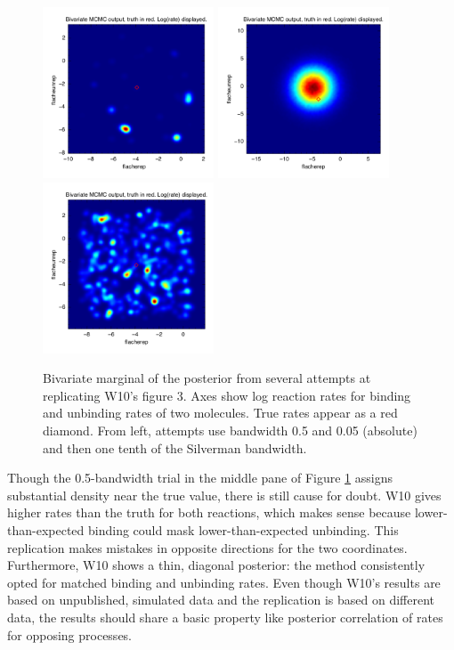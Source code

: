 \documentclass{article}
\begin{document}
\begin{figure}[h!]
\begin{center}
\includegraphics[height=2in,width=2in]{SigD_trial_small_bw_may27.png}
\includegraphics[height=2in,width=2in]{SigD_trial_large_bw_may_29.png}
\includegraphics[height=2in,width=2in]{june8_silverman_over_ten.png}
\caption{Bivariate marginal of the posterior from several attempts at replicating W10's figure 3. Axes show log reaction rates for binding and unbinding rates of two molecules. True rates appear as a red diamond. From left, attempts use bandwidth 0.5 and 0.05 (absolute) and then one tenth of the Silverman bandwidth. \label{fig:main_results}}
\end{center}
\end{figure}

Though the 0.5-bandwidth trial in the middle pane of Figure \ref{fig:main_results} assigns substantial density near the true value, there is still cause for doubt. W10 gives higher rates than the truth for both reactions, which makes sense because lower-than-expected binding could mask lower-than-expected unbinding. This replication makes mistakes in opposite directions for the two coordinates. Furthermore, W10 shows a thin, diagonal posterior: the method consistently opted for matched binding and unbinding rates. Even though W10's results are based on unpublished, simulated data and the replication is based on different data, the results should share a basic property like posterior correlation of rates for opposing processes.
\end{document}
